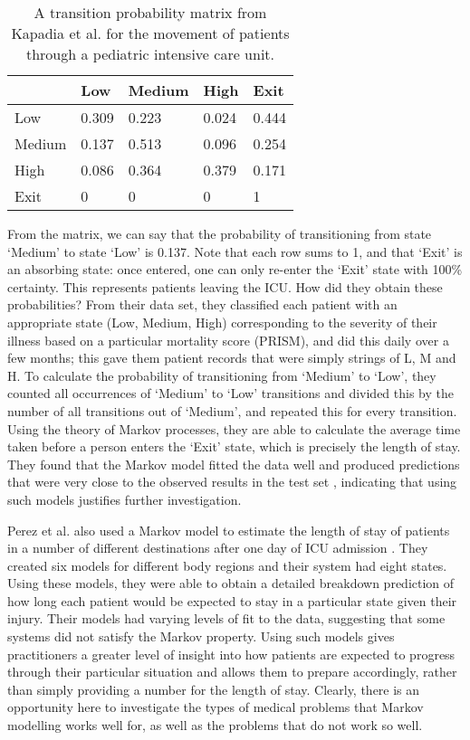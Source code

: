 \begin{table}[h]
\begin{tabular}{l|llll}
& Low & Medium & High & Exit \\
\hline
Low & 0.309 & 0.223 & 0.024 & 0.444 \\
Medium & 0.137 & 0.513 & 0.096 & 0.254 \\
High & 0.086 & 0.364 & 0.379 & 0.171 \\
Exit & 0 & 0 & 0 & 1 \\
\end{tabular}
\caption{A transition probability matrix from Kapadia et al. for the
movement of patients through a pediatric intensive care unit.}
\end{table}
From the matrix, we can say that the probability of transitioning from state
`Medium' to state `Low' is 0.137. Note that each row sums to 1, and that `Exit'
is an absorbing state: once entered, one can only re-enter the `Exit' state
with 100\% certainty. This represents patients leaving the ICU. How did they
obtain these probabilities? From their data set, they classified each patient
with an appropriate state (Low, Medium, High) corresponding to the severity of
their illness based on a particular mortality score (PRISM), and did this daily
over a few months; this gave them patient records that were simply strings of
L, M and H. To calculate the probability of transitioning from `Medium' to
`Low', they counted all occurrences of `Medium' to `Low' transitions and
divided this by the number of all transitions out of `Medium', and repeated
this for every transition. Using the theory of Markov processes, they are able
to calculate the average time taken before a person enters the `Exit' state,
which is precisely the length of stay. They found that the Markov model fitted
the data well and produced predictions that were very close to the observed
results in the test set \citep{Kapadia2000}, indicating that using such models
justifies further investigation.

Perez et al. also used a Markov model to estimate the length of stay of
patients in a number of different destinations after one day of ICU admission
 \citep{Perez2006}. They created six models for different body regions and their
system had eight states. Using these models, they were able to obtain a
detailed breakdown prediction of how long each patient would be expected to
stay in a particular state given their injury. Their models had varying levels
of fit to the data, suggesting that some systems did not satisfy the Markov
property. Using such models gives practitioners a greater level of insight
into how patients are expected to progress through their particular situation
and allows them to prepare accordingly, rather than simply providing a number
for the length of stay. Clearly, there is an opportunity here to investigate
the types of medical problems that Markov modelling works well for, as well as
the problems that do not work so well.

